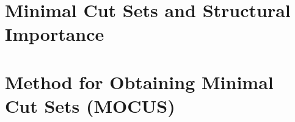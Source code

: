 \section{Minimal Cut Sets and Structural Importance}

\section{Method for Obtaining Minimal Cut Sets (MOCUS)}